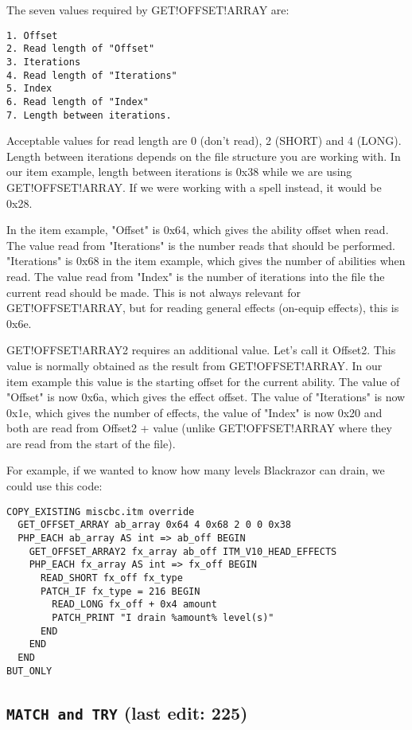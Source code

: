 \documentclass{article}
\def\DEFINE#1{{\tt \bf #1}\label{#1}\index{#1}}
\begin{document}
The seven values required by GET!OFFSET!ARRAY are:
\begin{verbatim}
1. Offset
2. Read length of "Offset"
3. Iterations
4. Read length of "Iterations"
5. Index
6. Read length of "Index"
7. Length between iterations.
\end{verbatim}

Acceptable values for read length are 0 (don't read), 2 (SHORT) and 4 (LONG). Length between iterations depends on the file structure you are working with. In our item example, length between iterations is 0x38 while we are using GET!OFFSET!ARRAY. If we were working with a spell instead, it would be 0x28.

In the item example, "Offset" is 0x64, which gives the ability offset when read.
The value read from "Iterations" is the number reads that should be performed. "Iterations" is 0x68 in the item example, which gives the number of abilities when read.
The value read from "Index" is the number of iterations into the file the current read should be made. This is not always relevant for GET!OFFSET!ARRAY, but for reading general effects (on-equip effects), this is 0x6e.

GET!OFFSET!ARRAY2 requires an additional value. Let's call it Offset2. This value is normally obtained as the result from GET!OFFSET!ARRAY. In our item example this value is the starting offset for the current ability. The value of "Offset" is now 0x6a, which gives the effect offset. The value of "Iterations" is now 0x1e, which gives the number of effects, the value of "Index" is now 0x20 and both are read from Offset2 + value (unlike GET!OFFSET!ARRAY where they are read from the start of the file).

For example, if we wanted to know how many levels Blackrazor can drain, we could use this code:
\begin{verbatim}
COPY_EXISTING miscbc.itm override
  GET_OFFSET_ARRAY ab_array 0x64 4 0x68 2 0 0 0x38
  PHP_EACH ab_array AS int => ab_off BEGIN
    GET_OFFSET_ARRAY2 fx_array ab_off ITM_V10_HEAD_EFFECTS
    PHP_EACH fx_array AS int => fx_off BEGIN
      READ_SHORT fx_off fx_type
      PATCH_IF fx_type = 216 BEGIN
        READ_LONG fx_off + 0x4 amount
        PATCH_PRINT "I drain %amount% level(s)"
      END
    END
  END
BUT_ONLY
\end{verbatim}


\subsection{\DEFINE{MATCH and TRY} (last edit: 225)}
\end{document}

